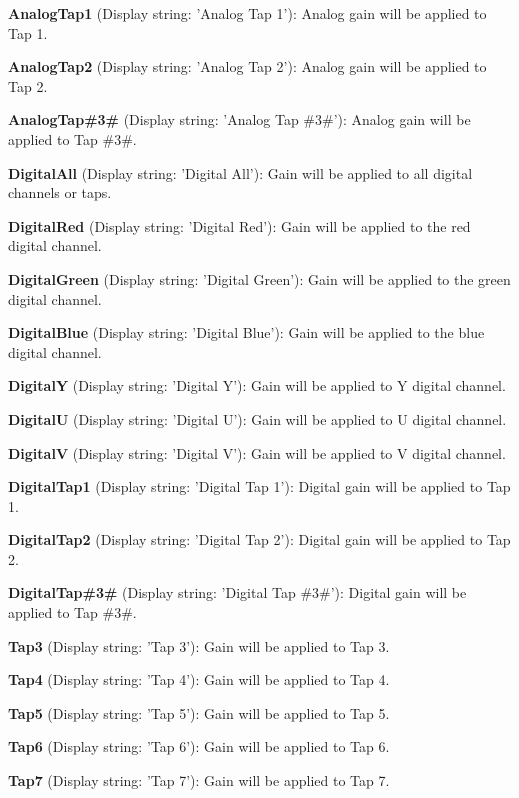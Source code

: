 \begin{DoxyItemize}
\item {\bfseries Analog\+Tap1} (Display string\+: 'Analog Tap 1')\+: Analog gain will be applied to Tap 1.
\item {\bfseries Analog\+Tap2} (Display string\+: 'Analog Tap 2')\+: Analog gain will be applied to Tap 2.
\item {\bfseries Analog\+Tap\#3\#} (Display string\+: 'Analog Tap \#3\#')\+: Analog gain will be applied to Tap \#3\#.
\item {\bfseries Digital\+All} (Display string\+: 'Digital All')\+: Gain will be applied to all digital channels or taps.
\item {\bfseries Digital\+Red} (Display string\+: 'Digital Red')\+: Gain will be applied to the red digital channel.
\item {\bfseries Digital\+Green} (Display string\+: 'Digital Green')\+: Gain will be applied to the green digital channel.
\item {\bfseries Digital\+Blue} (Display string\+: 'Digital Blue')\+: Gain will be applied to the blue digital channel.
\item {\bfseries Digital\+Y} (Display string\+: 'Digital Y')\+: Gain will be applied to Y digital channel.
\item {\bfseries Digital\+U} (Display string\+: 'Digital U')\+: Gain will be applied to U digital channel.
\item {\bfseries Digital\+V} (Display string\+: 'Digital V')\+: Gain will be applied to V digital channel.
\item {\bfseries Digital\+Tap1} (Display string\+: 'Digital Tap 1')\+: Digital gain will be applied to Tap 1.
\item {\bfseries Digital\+Tap2} (Display string\+: 'Digital Tap 2')\+: Digital gain will be applied to Tap 2.
\item {\bfseries Digital\+Tap\#3\#} (Display string\+: 'Digital Tap \#3\#')\+: Digital gain will be applied to Tap \#3\#.
\item {\bfseries Tap3} (Display string\+: 'Tap 3')\+: Gain will be applied to Tap 3.
\item {\bfseries Tap4} (Display string\+: 'Tap 4')\+: Gain will be applied to Tap 4.
\item {\bfseries Tap5} (Display string\+: 'Tap 5')\+: Gain will be applied to Tap 5.
\item {\bfseries Tap6} (Display string\+: 'Tap 6')\+: Gain will be applied to Tap 6.
\item {\bfseries Tap7} (Display string\+: 'Tap 7')\+: Gain will be applied to Tap 7.

\end{DoxyItemize}
